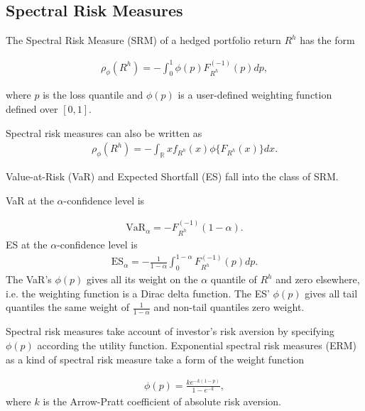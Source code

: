\subsection{Spectral Risk Measures}\label{subsec:spectral-risk-measures}
The Spectral Risk Measure (SRM) of a hedged portfolio return $R^h$ has the form

\begin{align}
	\rho_\phi(R^h) = - \int_0^1 \phi(p) F_{R^h}^{(-1)}(p)d p,
	\end{align}

where $p$ is the loss quantile and $\phi(p)$ is a user-defined weighting function defined over $[0,1]$. \medskip


Spectral risk measures can also be written as
\begin{align}
	\rho_\phi(R^h) = - \int_\mathbb{R} x f_{R^h}(x) \phi\{F_{R^h}(x)\} d x.
	\end{align}

Value-at-Risk (VaR) and Expected Shortfall (ES) fall into the class of SRM. \medskip

VaR at the $\alpha$-confidence level is

\begin{align}
	\text{VaR}_\alpha = - F_{R^h}^{(-1)}(1-\alpha).
	\end{align}
ES at the $\alpha$-confidence level is 
\begin{align}
	\text{ES}_\alpha = -\frac{1}{1-\alpha}\int_{0}^{1-\alpha} F_{R^h}^{(-1)}(p) d p.
	\end{align}
The VaR's $\phi(p)$ gives all its weight on the $\alpha$ quantile of $R^h$ and zero elsewhere,
i.e. the weighting function is a Dirac delta function.
The ES' $\phi(p)$ gives all tail quantiles the same weight of $\frac{1}{1-\alpha}$ and non-tail quantiles zero weight. \medskip

Spectral risk measures take account of investor's risk aversion by specifying $\phi(p)$ according the utility function.
Exponential spectral risk measures (ERM) as a kind of spectral risk measure take a form of the weight function

\begin{align}
	\phi(p) =\frac{k e^{-k(1-p)}}{1-e^{-k}} ,
	\end{align}
where $k$ is the Arrow-Pratt coefficient of absolute risk aversion. \medskip

